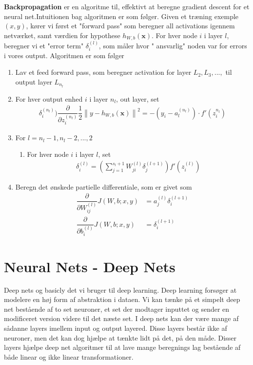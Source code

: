 \documentclass[paper=a4, fontsize=11pt]{scrartcl} %
\numberwithin{equation}{section} %
\numberwithin{figure}{section} %
\numberwithin{table}{section} %
\begin{document}
	 \textbf{Backpropagation} er en algoritme til, effektivt at beregne gradient descent for et neural net.Intuitionen bag algoritmen er som følger. Given et træning exemple $(x,y)$, kører vi først et "forward pass" som beregner all activations igennem netværket, samt værdien for hypothese $h_{W,b}(\mathbf{x})$. For hver node $i$ i layer $l$, beregner vi et "error term" $\delta_i^{(l)}$, som måler hvor " ansvarlig" noden var for errors i vores output. Algoritmen er som følger
	 \begin{enumerate}
	 	\item Lav et feed forward pass, som beregner activation for layer $L_2,L_3,...,$ til output layer $L_{n_l}$
	 	\item For hver output enhed $i$ i layer $n_l$, out layer, set
	 	\begin{align*}
	 	\delta^{(n_l)}_i)\dfrac{\partial}{\partial z_i^{(n_l)}}\dfrac{1}{2}\left\|y-h_{W,b}(\mathbf{x})\right\|^2=-(y_i-a_l^{(n_l)})\cdot f'(z^{n_l}_i)
	 	\end{align*}
	 	\item For $l=n_l-1,n_l-2,...,2$
	 	\begin{enumerate}
	 		\item For hver node $i$ i layer $l$, set \begin{align*}
	 		\delta^{(l)}_i=\left(\sum_{j=1}^{s_l+1}W_{ji}^{(l)}\delta_j^{(l+1)}\right)f'(z_i^{(l)})
	 		\end{align*}
	 	\end{enumerate}
	 	\item Beregn det ønskede partielle differentiale, som er givet som
	 	\begin{align*}
	 	\dfrac{\partial}{\partial W_{ij}^{(l)}}J(W,b;x,y)&=a^{(l)}_j \delta^{(l+1)}_i \\
	 	\dfrac{\partial}{\partial b_i^{(l)}}J(W,b;x,y)&=\delta^{(l+1)}_i
	 	\end{align*}
	 \end{enumerate}
	 
	\newpage
	
	\section*{Neural Nets - Deep Nets}
	
	Deep nets og basicly det vi bruger til deep learning. Deep learning forsøger at modelere en høj form af abstraktion i dataen. Vi kan tænke på et simpelt deep net bestående af to set neuroner, et set der modtager inputtet og sender en modificeret version videre til det næste set. I deep nets kan der være mange af sådanne layers imellem input og output layered. Disse layers består ikke af neuroner, men det kan dog hjælpe at tænkte lidt på det, på den måde. Disser layers hjælpe deep net algoritmer til at lave mange beregnings lag bestående af både linear og ikke linear transformationer. \\
	
\end{document}
